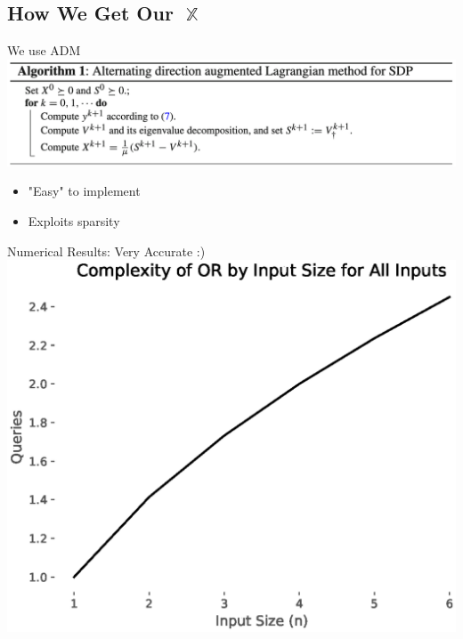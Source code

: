 \documentclass[12pt]{beamer}
\DeclareMathOperator{\X}{\mathbb{X}}		     %
\begin{document}
\subsection{How We Get Our $\X$}
\begin{frame}{We use ADM \cite{adm}}
\centering
\includegraphics[scale=.15]{figures/adm_algorithm}
\bigskip
\begin{itemize}
    \item "Easy" to implement
    \item Exploits sparsity
\end{itemize}
\end{frame}

\begin{frame}{Numerical Results: Very Accurate :)}
\centering
\includegraphics[scale=.5]{or_all_complexity.eps}
\end{frame}
\end{document}
